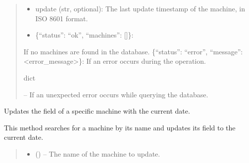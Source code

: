 \documentclass[letterpaper,10pt,english]{sphinxmanual}
\begin{document}
\begin{fulllineitems}
\begin{fulllineitems}
\begin{quote}
\begin{description}
\begin{description}
\begin{description}
\begin{itemize}
\item {} 
\sphinxAtStartPar
update (str, optional): The last update timestamp of the machine, in ISO 8601 format.

\end{itemize}

\end{description}
\begin{itemize}
\item {} 
\sphinxAtStartPar
\{“status”: “ok”, “machines”: {[}{]}\}:

\end{itemize}

\sphinxAtStartPar
If no machines are found in the database.
\sphinxhyphen{} \{“status”: “error”, “message”: <error\_message>\}:
If an error occurs during the operation.

\end{description}


\sphinxAtStartPar
dict

\sphinxAtStartPar
{} – If an unexpected error occurs while querying the database.

\end{description}\end{quote}

\end{fulllineitems}


\begin{fulllineitems}
\label{\detokenize{app.controllers:app.controllers.machine_controller.MachineController.updateMachineDate}}
\pysigstartsignatures
\pysiglinewithargsret
{}
{\sphinxparamcomma {}}
{}
\pysigstopsignatures
\sphinxAtStartPar
Updates the  field of a specific machine with the current date.

\sphinxAtStartPar
This method searches for a machine by its name and updates its  field
to the current date.
\begin{quote}\begin{description}
\begin{itemize}
\item {} 
\sphinxAtStartPar
{} () – The name of the machine to update.


\end{itemize}
\end{description}
\end{quote}
\end{fulllineitems}
\end{fulllineitems}
\end{document}
